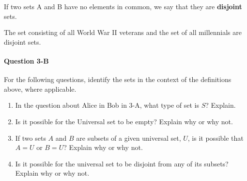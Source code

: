 \begin{definition}
If two sets A and B have no elements in common, we say that they are \textbf{disjoint} sets.
\end{definition}

\begin{example}
The set consisting of all World War II veterans and the set of all millennials are disjoint sets. 
\end{example}

\paragraph{Question 3-B}
For the following questions, identify the sets in the context of the definitions above, where applicable.
\begin{enumerate}
    
    \item In the question about Alice in Bob in 3-A, what type of set is $S$? Explain.
    \vspace{5em}
    
    \item Is it possible for the Universal set to be empty? Explain why or why not.
    \vspace{5em}
    
    \item If two sets $A$ and $B$ are subsets of a given universal set, $U$, is it possible that $A = U$ or $B = U$? Explain why or why not.
    \vspace{5em}
    
    \item Is it possible for the universal set to be disjoint from any of its subsets? Explain why or why not.
    \vspace{5em}

    
    
\end{enumerate}

















